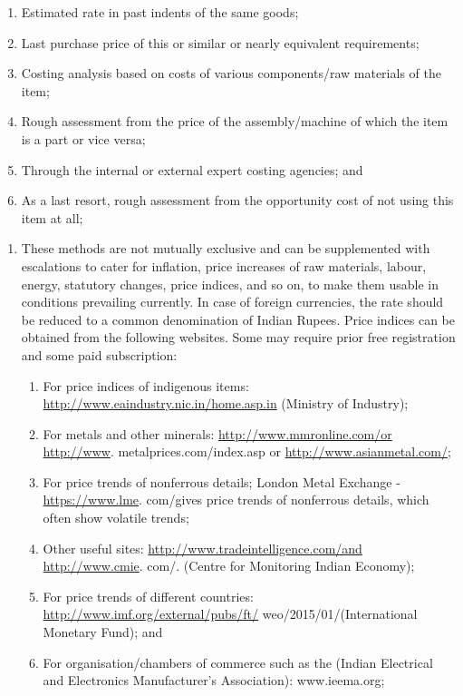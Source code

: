 \documentclass[
  11pt,
  twoside]{article}
\providecommand{\tightlist}{%
  \setlength{\itemsep}{0pt}\setlength{\parskip}{0pt}}
\begin{document}
\begin{enumerate}
  \begin{enumerate}
  \def\labelenumii{\alph{enumii})}
  \tightlist
  \item
    Estimated rate in past indents of the same goods;
  \item
    Last purchase price of this or similar or nearly equivalent requirements;
  \item
    Costing analysis based on costs of various components/raw materials of the item;
  \item
    Rough assessment from the price of the assembly/machine of which the item is a part or vice versa;
  \item
    Through the internal or external expert costing agencies; and
  \item
    As a last resort, rough assessment from the opportunity cost of not using this item at all;
  \end{enumerate}

  \begin{enumerate}
  \def\labelenumii{\roman{enumii})}
  \setcounter{enumii}{3}
  \tightlist
  \item
    These methods are not mutually exclusive and can be supplemented with escalations to cater for inflation, price increases of raw materials, labour, energy, statutory changes, price indices, and so on, to make them usable in conditions prevailing currently. In case of foreign currencies, the rate should be reduced to a common denomination of Indian Rupees. Price indices can be obtained from the following websites.
    Some may require prior free registration and some paid subscription:

    \begin{enumerate}
    \def\labelenumiii{\alph{enumiii})}
    \tightlist
    \item
      For price indices of indigenous items: \url{http://www.eaindustry.nic.in/home.asp.in} (Ministry of Industry);
    \item
      For metals and other minerals: \url{http://www.mmronline.com/or} \url{http://www}. metalprices.com/index.asp or \url{http://www.asianmetal.com/};
    \item
      For price trends of nonferrous details; London Metal Exchange - \url{https://www.lme}. com/gives price trends of nonferrous details, which often show volatile trends;
    \item
      Other useful sites: \url{http://www.tradeintelligence.com/and} \url{http://www.cmie}. com/. (Centre for Monitoring Indian Economy);
    \item
      For price trends of different countries: \url{http://www.imf.org/external/pubs/ft/} weo/2015/01/(International Monetary Fund); and
    \item
      For organisation/chambers of commerce such as the (Indian Electrical and Electronics Manufacturer's Association): www.ieema.org;
    \end{enumerate}
  \end{enumerate}
\end{enumerate}
\end{document}
